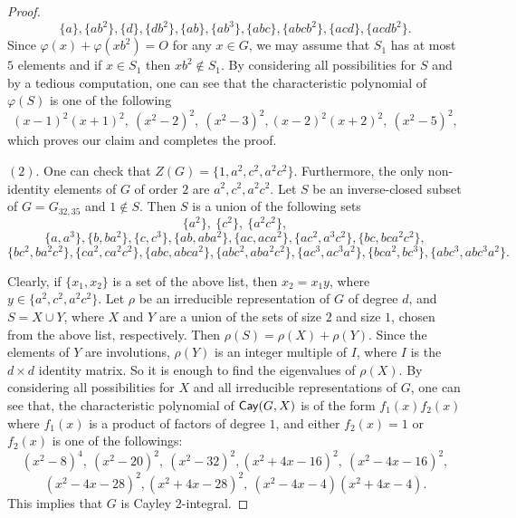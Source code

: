 \documentclass[10pt,a4paper]{amsart}
\def\Cay{{\sf Cay}} \def\Ker{{\sf Ker}}
\begin{document}
\begin{proof}
	$$\{ a \},  \{ ab^2 \},\{ d \}, \{ db^2 \}, \{ ab \}, \{ ab^3 \},	\{ abc \}, \{ abcb^2 \}, \{ acd \},  \{ acdb^2 \}.$$
	Since $\varphi(x)+\varphi(xb^2)=O$ for any $x\in G$, we may assume that $S_1$ has at most $5$ elements and if $x\in S_1$ then $xb^2\notin S_1$. By considering all possibilities for $S$ and by a tedious computation, one can see that the characteristic polynomial of $\varphi(S)$ is one of the following
	\[ (x-1)^2(x+1)^2,~ (x^2-2)^2,~(x^2-3)^2, (x-2)^2(x+2)^2,~(x^2-5)^2,\]
	which proves our claim and completes the proof.
	
	$(2)$. One can check that $Z(G)=\{1,a^2,c^2,a^2c^2\}$.  Furthermore, the only non-identity elements of $G$ of order $2$ are $a^2,c^2,a^2c^2$.  Let $S$ be an inverse-closed subset of $G=G_{32,35}$ and $1\notin S$. Then
	$S$ is a union of the following sets
	$$\{a^2\},~\{c^2\},~\{a^2c^2\},$$
	$$
	\{a, a^3\},
	\{b, ba^2\},
	\{ c, c^3\},
	\{ab, aba^2\},
	\{ac, aca^2\},
	\{ ac^2, a^3c^2\},
	\{ bc, bca^2c^2\},$$
	$$
	\{bc^2, ba^2c^2\},
	\{ca^2, ca^2c^2\},
	\{abc, abca^2\},
	\{abc^2, aba^2c^2\},
	\{ac^3, ac^3a^2\},
	\{bca^2, bc^3\},
	\{abc^3, abc^3a^2\}.
	$$
	
	Clearly, if $\{x_1,x_2\}$ is a set of the above list, then $x_2=x_1y$, where $y\in\{a^2,c^2,a^2c^2\}$. Let $\rho$ be an irreducible representation of $G$ of degree $d$, and $S=X\cup Y$, where $X$ and $Y$ are a union of the sets of size $2$ and size $1$, chosen from the above list,  respectively. Then $\rho(S)=\rho(X)+\rho(Y)$. Since the elements of $Y$ are involutions, $\rho(Y)$ is an integer multiple of  $I$, where $I$ is the $d\times d$ identity matrix. So it is enough to find the eigenvalues of $\rho(X)$. By considering all possibilities for $X$ and all irreducible representations of $G$, one can see that, the characteristic polynomial of $\Cay(G,X)$ is of the form $f_1(x)f_2(x)$ where $f_1(x)$ is a product of factors of degree $1$, and either $f_2(x)=1$ or $f_2(x)$ is one of the followings:
	\[(x^2-8)^4,~(x^2-20)^2,~(x^2-32)^2,(x^2+4x-16)^2,~(x^2-4x-16)^2,\]
	\[(x^2-4x-28)^2,(x^2+4x-28)^2,~(x^2-4x-4)(x^2+4x-4).\]
	This implies that $G$ is Cayley $2$-integral.
	

\end{proof}
\end{document}
